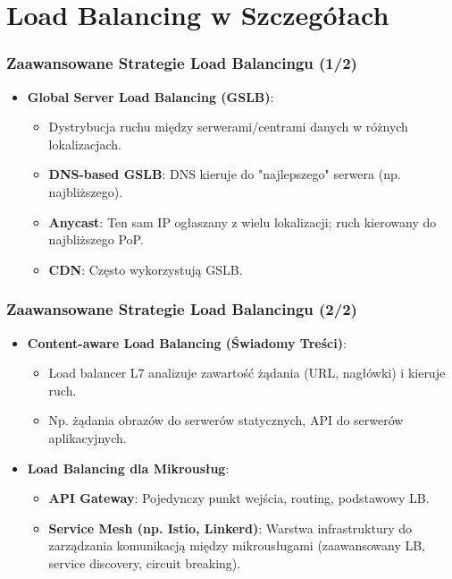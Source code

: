\documentclass[aspectratio=169,xcolor=table]{beamer}
\begin{document}
\section{Load Balancing w Szczegółach}

\begin{frame}
  \frametitle{Zaawansowane Strategie Load Balancingu (1/2)}
  \begin{itemize}
    \item \textbf{Global Server Load Balancing (GSLB)}:
        \begin{itemize}
            \item Dystrybucja ruchu między serwerami/centrami danych w różnych lokalizacjach.
            \item \textbf{DNS-based GSLB}: DNS kieruje do "najlepszego" serwera (np. najbliższego).
            \item \textbf{Anycast}: Ten sam IP ogłaszany z wielu lokalizacji; ruch kierowany do najbliższego PoP.
            \item \textbf{CDN}: Często wykorzystują GSLB.
        \end{itemize}
  \end{itemize}
\end{frame}

\begin{frame}
  \frametitle{Zaawansowane Strategie Load Balancingu (2/2)}
  \begin{itemize}
    \item \textbf{Content-aware Load Balancing (Świadomy Treści)}:
        \begin{itemize}
            \item Load balancer L7 analizuje zawartość żądania (URL, nagłówki) i kieruje ruch.
            \item Np. żądania obrazów do serwerów statycznych, API do serwerów aplikacyjnych.
        \end{itemize}
    \item \textbf{Load Balancing dla Mikrousług}:
        \begin{itemize}
            \item \textbf{API Gateway}: Pojedynczy punkt wejścia, routing, podstawowy LB.
            \item \textbf{Service Mesh (np. Istio, Linkerd)}: Warstwa infrastruktury do zarządzania komunikacją między mikrousługami (zaawansowany LB, service discovery, circuit breaking).
        \end{itemize}
  \end{itemize}
\end{frame}
\end{document}
